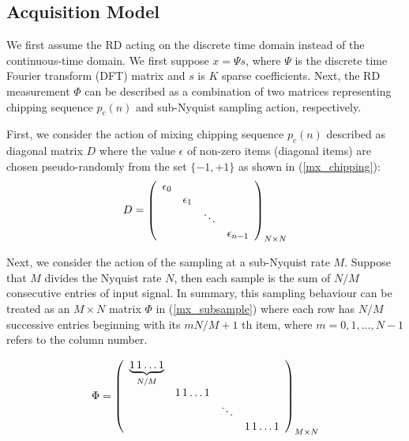 \subsection{Acquisition Model}

We first assume the RD acting on the discrete time domain instead of the continuous-time domain. We first suppose $x = \Psi s$, where $\Psi$ is the discrete time Fourier transform (DFT) matrix and $s$ is $K$ sparse coefficients. Next, the RD measurement $\Phi$ can be described as a combination of two matrices representing chipping sequence $p_c(n)$ and sub-Nyquist sampling action, respectively.

First, we consider the action of mixing chipping sequence $p_c(n)$ described as diagonal matrix $D$ where the value $\epsilon$ of non-zero items (diagonal items) are chosen pseudo-randomly from the set $\{-1,+1\}$ as shown in (\ref{mx_chipping}):
\begin{equation}
\label{mx_chipping}
D = \left(
\begin{array}[c]{cccc}
\epsilon_0 & & &\\
& \epsilon_1 & &\\
& & \ddots &\\
& & &\epsilon_{n-1}
\end{array}\right)_{N \times N}
\end{equation}

Next, we consider the action of the sampling at a sub-Nyquist rate $M$. Suppose that $M$ divides the Nyquist rate $N$, then each sample is the sum of $N/M$ consecutive entries of input signal\cite{kirolos2006analog}. In summary, this sampling behaviour can be treated as an $M \times N$ matrix $\Phi$ in (\ref{mx_subsample}) where each row has $N/M$ successive entries beginning with its $mN/M+1$ th item, where $m = 0,1,\ldots, N-1$ refers to the column number.

\begin{equation}
\label{mx_subsample}
\Phi = \left(
\begin{array}[c]{cccc}
{\underbrace{{1\hspace{0.15em}1}\ldots 1 }_{N/M}}& & & \\
 & {{1\hspace{0.15em}1}\ldots 1 } & & \\
 & & \ddots & \\
 & & & {{1\hspace{0.15em}1}\ldots 1 }
\end{array}\right)_{M \times N}
\end{equation}

